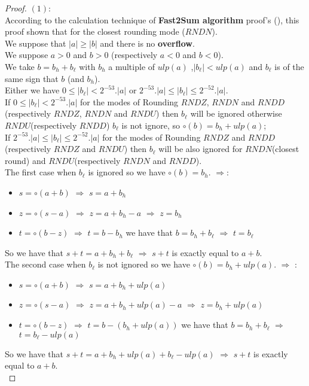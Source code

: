 \begin{proof} \color{-yellow}
$(1)$:\\
According to the calculation technique of  \textbf{Fast2Sum algorithm} proof's (\cite{muller2010handbook}), this proof shown that for the closest rounding mode ($RNDN$).\\
We suppose that $\lvert a \rvert \ge \lvert b \rvert $ and  there is no \textbf{overflow}.\\
 We suppose $a > 0$ and $b > 0$ (respectively  $a < 0$ and $b < 0$).\\
 We take $b = b_h + b_{\ell}$ with $b_h$ a multiple of $ulp(a)$ ,$\lvert b_{\ell}\rvert
< ulp(a)$ and  $b_{\ell}$ is of the same sign that $b$ (and $b_h$).\\



Either we have $0 \le \lvert b_{\ell} \rvert  < 2^{-53}. \lvert a \rvert$ or  $ 2^{-53}. \lvert a \rvert \le\lvert b_{\ell} \rvert \le  2^{-52}. \lvert a \rvert$.\\
If $0 \le \lvert b_{\ell} \rvert  < 2^{-53}. \lvert a \rvert$ for the modes of Rounding $RNDZ$, $RNDN$ and $RNDD$ (respectively $RNDZ$, $RNDN$ and $RNDU$) then $b_{\ell}$ will be ignored
otherwise $RNDU$(respectively  $RNDD$) $b_{\ell}$ is not ignore, so  $\circ (b) = b_h + ulp(a)$;\\
If $ 2^{-53}. \lvert a \rvert \le\lvert b_{\ell} \rvert \le  2^{-52}. \lvert a \rvert$ for the modes of Rounding $RNDZ$ and $RNDD$ (respectively $RNDZ$ and 
$RNDU$) then $b_{\ell}$ will be also ignored for $RNDN$(closest round) and $RNDU$(respectively $RNDN$ and $RNDD$).\\
The first case when $b_{\ell}$ is ignored so we have $\circ (b) = b_h $.
$\Rightarrow$:
\begin{itemize}
\item $s = \circ (a+b)$ $\Rightarrow$ $s = a + b_h$
\item $z = \circ (s-a)$ $\Rightarrow$ $z = a + b_h - a$  $\Rightarrow$ $z = b_h$
\item $t = \circ (b-z)$ $\Rightarrow$ $t = b - b_h$ we have that $b = b_h+b_{\ell}$ $\Rightarrow$ $t = b_{\ell}$
\end{itemize}
So we have that $s+t = a+b_h+b_{\ell}$ $\Rightarrow$ $s+t$ is exactly equal to $a+b$.\\


The second case when $b_{\ell}$ is not ignored so we have $\circ (b) = b_h +ulp(a)$.
$\Rightarrow$ :
\begin{itemize}
    \item $s = \circ (a+b)$ $\Rightarrow$ $s = a + b_h + ulp(a)$
    \item $z = \circ (s-a)$ $\Rightarrow$ $z = a + b_h + ulp(a) - a$  $\Rightarrow$ $z = b_h + ulp(a)$
    \item $t = \circ (b-z)$ $\Rightarrow$ $t = b - (b_h+ ulp(a))$ we have that $b = b_h+b_{\ell}$ $\Rightarrow$ $t = b_{\ell} - ulp(a)$
\end{itemize}
So we have that $s+t = a+b_h+ulp(a)+b_{\ell}-ulp(a)$ $\Rightarrow$ $s+t$ is exactly equal to $a+b$.\\


\end{proof}
